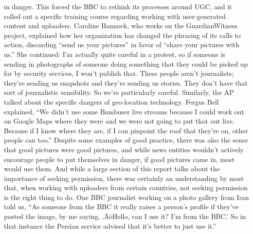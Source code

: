 \documentclass[symmetric, notoc, nobib]{towcenter-book}
\begin{document}
in danger. This forced the BBC to rethink its processes around UGC, and it
rolled out a specific training course regarding working with user-generated
content and uploaders.
Caroline Bannock, who works on the GuardianWitness project, explained
how her organization has changed the phrasing of its calls to action, discarding
``send us your pictures'' in favor of ``share your pictures with us.''
She continued:
I'm actually quite careful in a protest, so if someone is sending in
photographs of someone doing something that they could be picked
up for by security services, I won't publish that. These people aren't
journalists; they're sending us snapshots and they're sending us stories.
They don't have that sort of journalistic sensibility. So we're
particularly careful.
Similarly, the AP talked about the specific dangers of geo-location technology.
Fergus Bell explained, ``We didn't use some Bambuser live streams
because I could work out on Google Maps where they were and we were not
going to put that out live. Because if I know where they are, if I can pinpoint
the roof that they're on, other people can too.'' Despite some examples of
good practice, there was also the sense that good pictures were good pictures,
and while news entities wouldn't actively encourage people to put
themselves in danger, if good pictures came in, most would use them.
And while a large section of this report talks about the importance of seeking
permission, there was certainly an understanding by most that, when
working with uploaders from certain countries, not seeking permission is
the right thing to do. One BBC journalist working on a photo gallery from
Iran told us, ``As someone from the BBC it really raises a person's profile if
they've posted the image, by me saying, ‚ÄòHello, can I use it? I'm from the
BBC.' So in that instance the Persian service advised that it's better to just
use it.''
\end{document}
